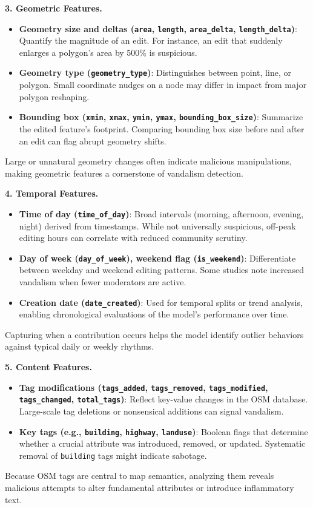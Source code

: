 \documentclass[
    13pt, %
    a4paper, %
    listof=totoc, %
    bibliography=totoc, %
    index=totoc, %
    headsepline
]{scrreprt}
\begin{document}
\vspace{1em}
\noindent
\textbf{3. Geometric Features.}
\begin{itemize}
  \item \textbf{Geometry size and deltas (\texttt{area}, \texttt{length}, \texttt{area\_delta}, \texttt{length\_delta})}: Quantify the magnitude of an edit. For instance, an edit that suddenly enlarges a polygon’s area by 500\% is suspicious.
  \item \textbf{Geometry type (\texttt{geometry\_type})}: Distinguishes between point, line, or polygon. Small coordinate nudges on a node may differ in impact from major polygon reshaping.
  \item \textbf{Bounding box (\texttt{xmin}, \texttt{xmax}, \texttt{ymin}, \texttt{ymax}, \texttt{bounding\_box\_size})}: Summarize the edited feature’s footprint. Comparing bounding box size before and after an edit can flag abrupt geometry shifts.
\end{itemize}
Large or unnatural geometry changes often indicate malicious manipulations, making geometric features a cornerstone of vandalism detection.

\vspace{1em}
\noindent
\textbf{4. Temporal Features.}
\begin{itemize}
  \item \textbf{Time of day (\texttt{time\_of\_day})}: Broad intervals (morning, afternoon, evening, night) derived from timestamps. While not universally suspicious, off-peak editing hours can correlate with reduced community scrutiny.
  \item \textbf{Day of week (\texttt{day\_of\_week}), weekend flag (\texttt{is\_weekend})}: Differentiate between weekday and weekend editing patterns. Some studies note increased vandalism when fewer moderators are active.
  \item \textbf{Creation date (\texttt{date\_created})}: Used for temporal splits or trend analysis, enabling chronological evaluations of the model’s performance over time.
\end{itemize}
Capturing when a contribution occurs helps the model identify outlier behaviors against typical daily or weekly rhythms.

\vspace{1em}
\noindent
\textbf{5. Content Features.}
\begin{itemize}
  \item \textbf{Tag modifications (\texttt{tags\_added}, \texttt{tags\_removed}, \texttt{tags\_modified}, \newline \texttt{tags\_changed}, \texttt{total\_tags})}: Reflect key-value changes in the OSM database. Large-scale tag deletions or nonsensical additions can signal vandalism.
  \item \textbf{Key tags (e.g., \texttt{building}, \texttt{highway}, \texttt{landuse})}: Boolean flags that determine whether a crucial attribute was introduced, removed, or updated. Systematic removal of \texttt{building} tags might indicate sabotage.
\end{itemize}
Because OSM tags are central to map semantics, analyzing them reveals malicious attempts to alter fundamental attributes or introduce inflammatory text.
\end{document}
